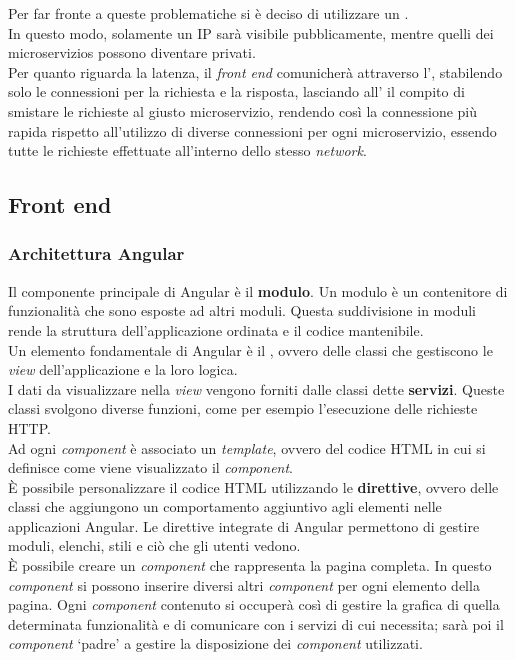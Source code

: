 \noindent Per far fronte a queste problematiche si è deciso di utilizzare un
.\\
In questo modo, solamente un \gls{IP} sarà visibile pubblicamente, mentre
quelli dei \glspl{microservizio} possono diventare privati.\\
Per quanto riguarda la latenza, il \textit{front end} comunicherà attraverso
l', stabilendo solo le connessioni per la richiesta e
la risposta, lasciando all' il compito di smistare le
richieste al giusto \gls{microservizio}, rendendo così la connessione più
rapida rispetto all'utilizzo di diverse connessioni per ogni
\gls{microservizio}, essendo tutte le richieste effettuate all'interno dello
stesso \textit{network}.

\subsection{Front end}
\subsubsection{Architettura Angular}
Il componente principale di Angular è il \textbf{modulo}. Un modulo è un
contenitore di funzionalità che sono esposte ad altri moduli. Questa
suddivisione in moduli rende la struttura dell'applicazione ordinata e il
codice mantenibile.\\
Un elemento fondamentale di Angular è il , ovvero delle classi
che gestiscono le \textit{view} dell'applicazione e la loro logica.\\
I dati da visualizzare nella \textit{view} vengono forniti dalle classi dette
\textbf{servizi}. Queste classi svolgono diverse funzioni, come per esempio
l'esecuzione delle richieste HTTP.\\
Ad ogni \textit{component} è associato un \textit{template}, ovvero del codice
HTML in
cui si definisce come viene visualizzato il \textit{component}.\\
È possibile personalizzare il codice HTML utilizzando le \textbf{direttive},
ovvero delle classi che aggiungono un comportamento aggiuntivo agli elementi
nelle applicazioni Angular. Le direttive integrate di Angular permettono di
gestire moduli, elenchi, stili e ciò che gli utenti vedono.\\
È possibile creare un \textit{component} che rappresenta la pagina completa. In
questo \textit{component} si possono inserire diversi altri \textit{component}
per ogni elemento della pagina.
Ogni \textit{component} contenuto si occuperà così di gestire la grafica di
quella determinata funzionalità e di comunicare con i servizi di cui necessita;
sarà poi il \textit{component} \enquote*{padre} a gestire la disposizione dei
\textit{component} utilizzati. \cite{site-angular-concepts}

